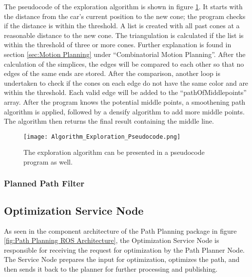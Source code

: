 The pseudocode of the exploration algorithm is shown in figure \ref{fig:Algorithm Exploration Pseudocode}. It starts with the distance from the car's current position to the new cone; the program checks if the distance is within the threshold. A list is created with all past cones at a reasonable distance to the new cone. The triangulation is calculated if the list is within the threshold of three or more cones. Further explanation is found in section \ref{sec:Motion Planning} under ``Combinatorial Motion Planning''. After the calculation of the simplices, the edges will be compared to each other so that no edges of the same ends are stored. After the comparison, another loop is undertaken to check if the cones on each edge do not have the same color and are within the threshold. Each valid edge will be added to the ``pathOfMiddlepoints'' array. After the program knows the potential middle points, a smoothening path algorithm is applied, followed by a densify algorithm to add more middle points. The algorithm then returns the final result containing the middle line.

\begin{figure}[H]
    \centering
    \texttt{[image: Algorithm\_Exploration\_Pseudocode.png]}
    \caption{The exploration algorithm can be presented in a pseudocode program as well.}
    \label{fig:Algorithm Exploration Pseudocode}
\end{figure}

\subsubsection{Planned Path Filter} \label{sec:Planned Path Filter}
\lipsum[1]

\subsection{Optimization Service Node} \label{sec:Optimization Service Node}
As seen in the component architecture of the Path Planning package in figure \ref{fig:Path Planning ROS Architecture}, the Optimization Service Node is responsible for receiving the request for optimization by the Path Planner Node. The Service Node prepares the input for optimization, optimizes the path, and then sends it back to the planner for further processing and publishing.

